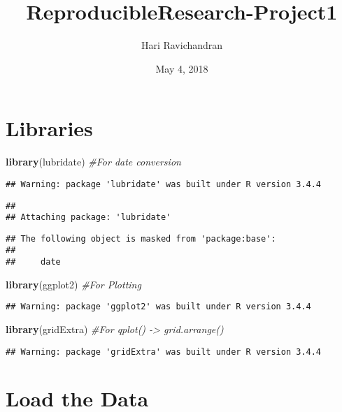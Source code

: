 \documentclass[]{article}
\title{ReproducibleResearch-Project1}
\author{Hari Ravichandran}
\date{May 4, 2018}
\newenvironment{Shaded}{\begin{snugshade}}{\end{snugshade}}
\newcommand{\KeywordTok}[1]{\textcolor[rgb]{0.13,0.29,0.53}{\textbf{#1}}}
\newcommand{\CommentTok}[1]{\textcolor[rgb]{0.56,0.35,0.01}{\textit{#1}}}
\newcommand{\NormalTok}[1]{#1}
\begin{document}
\maketitle

\section{Libraries}\label{libraries}

\begin{Shaded}
\begin{Highlighting}[]
\KeywordTok{library}\NormalTok{(lubridate) }\CommentTok{#For date conversion}
\end{Highlighting}
\end{Shaded}

\begin{verbatim}
## Warning: package 'lubridate' was built under R version 3.4.4
\end{verbatim}

\begin{verbatim}
## 
## Attaching package: 'lubridate'
\end{verbatim}

\begin{verbatim}
## The following object is masked from 'package:base':
## 
##     date
\end{verbatim}

\begin{Shaded}
\begin{Highlighting}[]
\KeywordTok{library}\NormalTok{(ggplot2) }\CommentTok{#For Plotting}
\end{Highlighting}
\end{Shaded}

\begin{verbatim}
## Warning: package 'ggplot2' was built under R version 3.4.4
\end{verbatim}

\begin{Shaded}
\begin{Highlighting}[]
\KeywordTok{library}\NormalTok{(gridExtra) }\CommentTok{#For qplot() -> grid.arrange()}
\end{Highlighting}
\end{Shaded}

\begin{verbatim}
## Warning: package 'gridExtra' was built under R version 3.4.4
\end{verbatim}

\section{Load the Data}\label{load-the-data}
\end{document}
